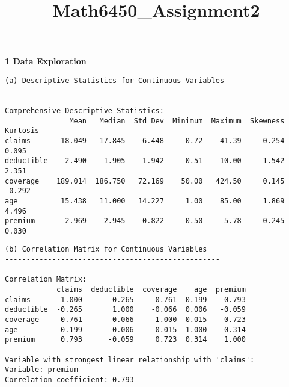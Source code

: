 \documentclass[8pt, twocolumn]{extarticle}
\title{Math6450\_Assignment2}
\begin{document}
    \maketitle
    \textbf{1 Data Exploration}
    \begin{Verbatim}[commandchars=\\\{\}]
(a) Descriptive Statistics for Continuous Variables
--------------------------------------------------

Comprehensive Descriptive Statistics:
               Mean   Median  Std Dev  Minimum  Maximum  Skewness  Kurtosis
claims       18.049   17.845    6.448     0.72    41.39     0.254     0.095
deductible    2.490    1.905    1.942     0.51    10.00     1.542     2.351
coverage    189.014  186.750   72.169    50.00   424.50     0.145    -0.292
age          15.438   11.000   14.227     1.00    85.00     1.869     4.496
premium       2.969    2.945    0.822     0.50     5.78     0.245     0.030
    \end{Verbatim}
    \begin{Verbatim}[commandchars=\\\{\}]
(b) Correlation Matrix for Continuous Variables
--------------------------------------------------

Correlation Matrix:
            claims  deductible  coverage    age  premium
claims       1.000      -0.265     0.761  0.199    0.793
deductible  -0.265       1.000    -0.066  0.006   -0.059
coverage     0.761      -0.066     1.000 -0.015    0.723
age          0.199       0.006    -0.015  1.000    0.314
premium      0.793      -0.059     0.723  0.314    1.000

Variable with strongest linear relationship with 'claims':
Variable: premium
Correlation coefficient: 0.793
    \end{Verbatim}
    \begin{center}
    \end{center}
    { \hspace*{\fill} \\}
\end{document}
